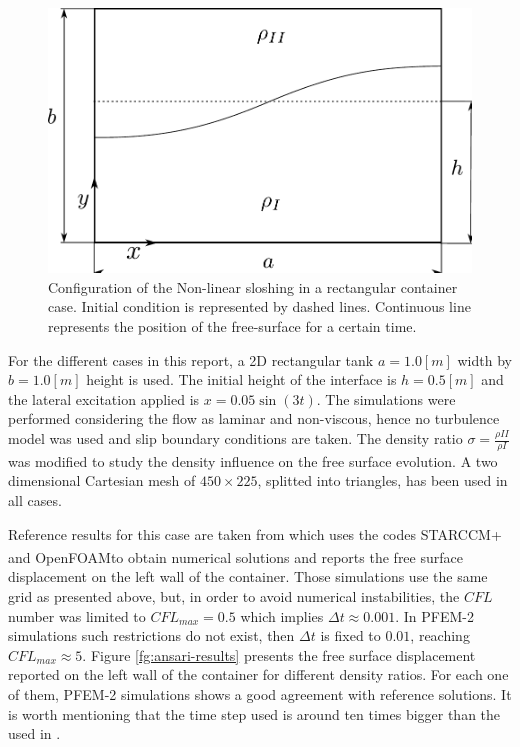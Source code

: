 \documentclass[a4paper,conference]{IEEEtran}
\newcommand{\OF}{OpenFOAM\textsuperscript{\textregistered}}
\begin{document}
\begin{figure}
  \begin{center}
      \includegraphics[width=.6\columnwidth]{images/ansari_config.pdf}
  \end{center}
  \caption{\label{fg:ansari-config} Configuration of the Non-linear sloshing in a rectangular container case. Initial condition is represented by dashed lines. Continuous line represents the position of the free-surface for a certain time.}
\end{figure}

For the different cases in this report, a 2D rectangular tank $a=1.0[m]$ width by $b=1.0[m]$ height is used. The initial height of the interface is $h=0.5[m]$ and the lateral excitation applied is $x=0.05\sin(3t)$. The simulations were performed considering the
flow as laminar and non-viscous, hence no turbulence model was used and slip boundary conditions are taken. The density ratio $\sigma=\frac{\rho{II}}{\rho{I}}$ was modified to study the density influence on the free surface evolution. A two dimensional Cartesian mesh of $450\times225$, splitted into triangles, has been used in all cases.

Reference results for this case are taken from \cite{Goni13} which uses the codes STARCCM+ and \OF to obtain numerical solutions and reports the free surface displacement on the left wall of the container. Those simulations use the same grid as presented above, but, in order to avoid numerical instabilities, the $CFL$ number was limited to $CFL_{max}=0.5$ which implies $\Delta t \approx 0.001$. In PFEM-2 simulations such restrictions do not exist, then $\Delta t$ is fixed to $0.01$, reaching $CFL_{max}\approx5$.
Figure \ref{fg:ansari-results} presents the free surface displacement reported on the left wall of the container for different density ratios. For each one of them, PFEM-2 simulations shows a good agreement with reference solutions. It is worth mentioning that the time step used is around ten times bigger than the used in \cite{Goni13}.
\end{document}
